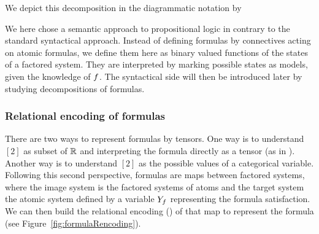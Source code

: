 We depict this decomposition in the diagrammatic notation by
\begin{center}
	
\end{center}









We here chose a semantic approach to propositional logic in contrary to the standard syntactical approach.
Instead of defining formulas by connectives acting on atomic formulas, we define them here as binary valued functions of the states of a factored system.
They are interpreted by marking possible states as models, given the knowledge of $f$.
The syntactical side will then be introduced later by studying decompositions of formulas.


%	


\subsubsection{Relational encoding of formulas}


There are two ways to represent formulas by tensors.
One way is to understand $[2]$ as subset of $\mathbb{R}$ and interpreting the formula directly as a tensor (as in ).
Another way is to understand $[2]$ as the possible values of a categorical variable.
Following this second perspective, formulas are maps between factored systems, where the image system is the factored systems of atoms and the target system the atomic system defined by a variable $Y_{f}$ representing the formula satisfaction.
We can then build the relational encoding () of that map to represent the formula (see Figure~\ref{fig:formulaRencoding}).

